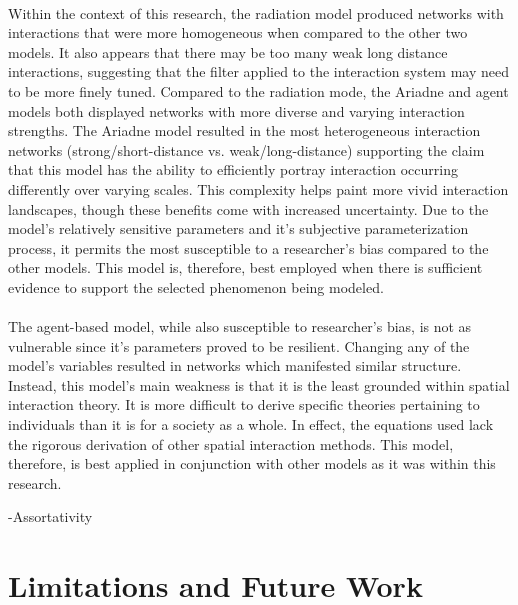 \documentclass[12pt,a4paper]{thesis}
\begin{document}
\paragraph{{}}
Within the context of this research, the radiation model produced networks with interactions that were more homogeneous when compared to the other two models. It also appears that there may be too many weak long distance interactions, suggesting that the filter applied to the interaction system may need to be more finely tuned. Compared to the radiation mode, the Ariadne and agent models both displayed networks with more diverse and varying interaction strengths. The Ariadne model resulted in the most heterogeneous interaction networks (strong/short-distance vs. weak/long-distance) supporting the claim that this model has the ability to efficiently portray interaction occurring differently over varying scales. This complexity helps paint more vivid interaction landscapes, though these benefits come with increased uncertainty. Due to the model's relatively sensitive parameters and it's subjective parameterization process, it permits the most susceptible to a researcher's bias compared to the other models. This model is, therefore, best employed when there is sufficient evidence to support the selected phenomenon being modeled.      

\paragraph{}
The agent-based model, while also susceptible to researcher's bias, is not as vulnerable since it's parameters proved to be resilient. Changing any of the model's variables resulted in networks which manifested similar structure. Instead, this model's main weakness is that it is the least grounded within spatial interaction theory. It is more difficult to derive specific theories pertaining to individuals than it is for a society as a whole. In effect, the equations used lack the rigorous derivation of other spatial interaction methods. This model, therefore, is best applied in conjunction with other models as it was within this research.   

-Assortativity

\section{Limitations and Future Work}
\end{document}
